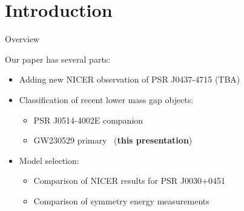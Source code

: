 \documentclass[usenames,dvipsnames,t]{beamer}
\begin{document}




\section{Introduction}

\begin{frame}{Overview}

  \def\x{4mm}
  \def\y{3mm}

  Our paper has several parts:
  \begin{itemize}
    \vspace{\x}
    \item Adding new NICER observation of PSR J0437-4715 (TBA)

    \vspace{\x}

    \item Classification of recent lower mass gap objects:
    \begin{itemize}
      \vspace{\y}
      \item  PSR J0514-4002E companion

      \vspace{\y}

      \item GW230529 primary~\cite{LIGOScientific:2024elc} (\textbf{this presentation})
    \end{itemize}

    \vspace{\x}
    
    \item Model selection: 
    \begin{itemize}
      \vspace{\y}
      \item  Comparison of NICER results for PSR J0030+0451

      \vspace{\y}

      \item Comparison of symmetry energy measurements
    \end{itemize}
    
  \end{itemize}
  
\end{frame}
\end{document}
